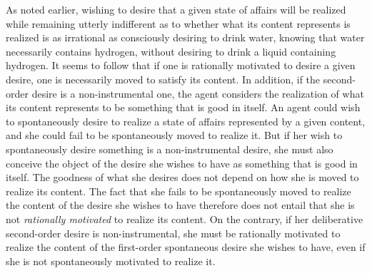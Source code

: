 \documentclass[output=paper]{langscibook}
\begin{document}
As noted earlier, wishing to desire that a given state of affairs will be realized while remaining utterly indifferent as to whether what its content represents is realized is as irrational as consciously desiring to drink water, knowing that water necessarily contains hydrogen, without desiring to drink a liquid containing hydrogen. It seems to follow that if one is rationally motivated to desire a given desire, one is necessarily moved to satisfy its content. In addition, if the second-order desire is a non-instrumental one, the agent considers the realization of what its content represents to be something that is good in itself. An agent could wish to spontaneously desire to realize a state of affairs represented by a given content, and she could fail to be spontaneously moved to realize it. But if her wish to spontaneously desire something is a non-instrumental desire, she must also conceive the object of the desire she wishes to have as something that is good in itself. The goodness of what she desires does not depend on how she is moved to realize its content. The fact that she fails to be spontaneously moved to realize the content of the desire she wishes to have therefore does not entail that she is not \textit{rationally motivated} to realize its content. On the contrary, if her deliberative second-order desire is non-instrumental, she must be rationally motivated to realize the content of the first-order spontaneous desire she wishes to have, even if she is not spontaneously motivated to realize it. 
\end{document}
